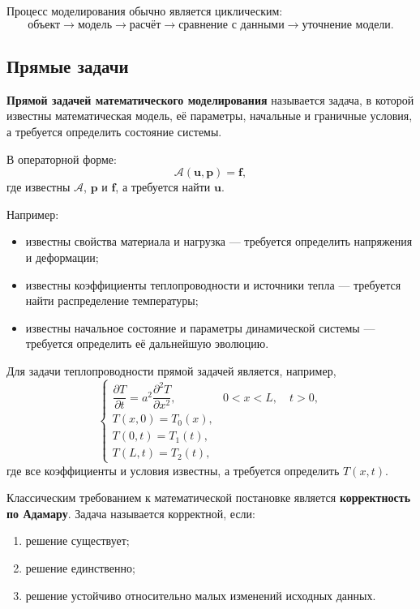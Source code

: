Процесс моделирования обычно является циклическим:
\[
\text{объект}
\rightarrow
\text{модель}
\rightarrow
\text{расчёт}
\rightarrow
\text{сравнение с данными}
\rightarrow
\text{уточнение модели}.
\]


\subsection{Прямые задачи}

\textbf{Прямой задачей математического моделирования} называется задача,
в которой известны математическая модель, её параметры, начальные и граничные
условия, а требуется определить состояние системы.

В операторной форме:
\[
\mathcal{A}(\mathbf{u},\mathbf{p})=\mathbf{f},
\]
где известны $\mathcal{A}$, $\mathbf{p}$ и $\mathbf{f}$,
а требуется найти $\mathbf{u}$.

Например:
\begin{itemize}
	\item известны свойства материала и нагрузка --- требуется определить
	напряжения и деформации;
	\item известны коэффициенты теплопроводности и источники тепла ---
	требуется найти распределение температуры;
	\item известны начальное состояние и параметры динамической системы ---
	требуется определить её дальнейшую эволюцию.
\end{itemize}

Для задачи теплопроводности прямой задачей является, например,
\[
\begin{cases}
	\dfrac{\partial T}{\partial t}
	=
	a^2\dfrac{\partial^2 T}{\partial x^2},
	&
	0<x<L,\quad t>0,\\[2mm]
	T(x,0)=T_0(x),\\
	T(0,t)=T_1(t),\\
	T(L,t)=T_2(t),
\end{cases}
\]
где все коэффициенты и условия известны, а требуется определить
$T(x,t)$.

Классическим требованием к математической постановке является
\textbf{корректность по Адамару}. Задача называется корректной, если:
\begin{enumerate}
	\item решение существует;
	\item решение единственно;
	\item решение устойчиво относительно малых изменений исходных данных.
\end{enumerate}


